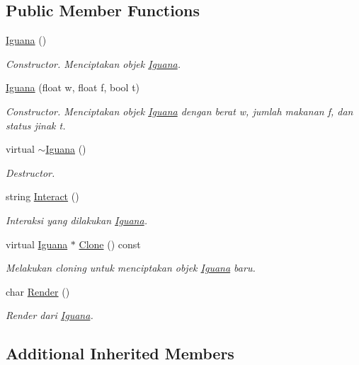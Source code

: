 \subsection*{Public Member Functions}
\begin{DoxyCompactItemize}
\item 
\hyperlink{classIguana_aadc10a5bb8364d915bfd1d3d8ab3156a}{Iguana} ()
\begin{DoxyCompactList}\small\item\em Constructor. Menciptakan objek \hyperlink{classIguana}{Iguana}. \end{DoxyCompactList}\item 
\hyperlink{classIguana_ae03d713eaadf2182168ce23f25ed36f8}{Iguana} (float w, float f, bool t)
\begin{DoxyCompactList}\small\item\em Constructor. Menciptakan objek \hyperlink{classIguana}{Iguana} dengan berat w, jumlah makanan f, dan status jinak t. \end{DoxyCompactList}\item 
virtual \hyperlink{classIguana_af0a4082cc22aea6f76f42c859d9375ad}{$\sim$\+Iguana} ()
\begin{DoxyCompactList}\small\item\em Destructor. \end{DoxyCompactList}\item 
string \hyperlink{classIguana_a271ef320fd3d4973e50e89aa30cffe3e}{Interact} ()
\begin{DoxyCompactList}\small\item\em Interaksi yang dilakukan \hyperlink{classIguana}{Iguana}. \end{DoxyCompactList}\item 
virtual \hyperlink{classIguana}{Iguana} $\ast$ \hyperlink{classIguana_a40e56fb855d09d2a8788dc73e2fdfc8a}{Clone} () const 
\begin{DoxyCompactList}\small\item\em Melakukan cloning untuk menciptakan objek \hyperlink{classIguana}{Iguana} baru. \end{DoxyCompactList}\item 
char \hyperlink{classIguana_a18bbb71a80e6b2a9855623b1c7f108b9}{Render} ()
\begin{DoxyCompactList}\small\item\em Render dari \hyperlink{classIguana}{Iguana}. \end{DoxyCompactList}\end{DoxyCompactItemize}
\subsection*{Additional Inherited Members}


